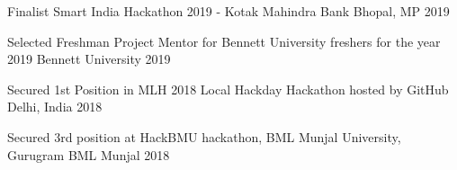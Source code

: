 
\begin{cvhonors}

  \cvhonor
    {Finalist} %
    {Smart India Hackathon 2019 - Kotak Mahindra Bank} %
    {Bhopal, MP} %
    {2019} %

  \cvhonor
    {Selected} %
    {Freshman Project Mentor for Bennett University freshers for the year 2019} %
    {Bennett University} %
    {2019} %

  \cvhonor
    {Secured 1st Position} %
    { in MLH 2018 Local Hackday Hackathon hosted by GitHub} %
    {Delhi, India} %
    {2018} %

  \cvhonor
    {Secured 3rd position} %
    { at HackBMU hackathon, BML Munjal University, Gurugram} %
    {BML Munjal} %
    {2018} %

\end{cvhonors}
